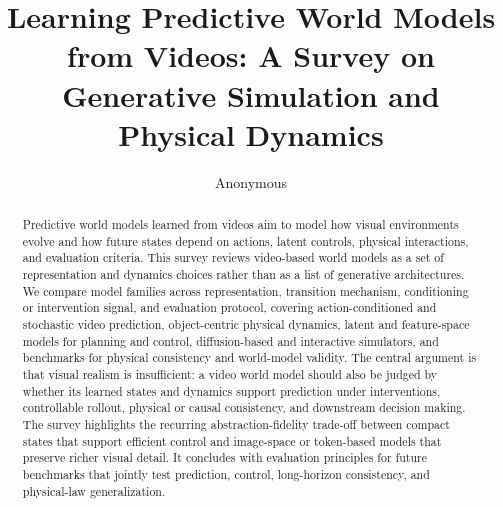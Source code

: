 \documentclass[11pt]{article}
\title{Learning Predictive World Models from Videos: A Survey on Generative Simulation and Physical Dynamics}
\author{Anonymous}
\date{}
\begin{document}
\maketitle

\begin{abstract}
Predictive world models learned from videos aim to model how visual environments evolve and how future states depend on actions, latent controls, physical interactions, and evaluation criteria. This survey reviews video-based world models as a set of representation and dynamics choices rather than as a list of generative architectures. We compare model families across representation, transition mechanism, conditioning or intervention signal, and evaluation protocol, covering action-conditioned and stochastic video prediction, object-centric physical dynamics, latent and feature-space models for planning and control, diffusion-based and interactive simulators, and benchmarks for physical consistency and world-model validity. The central argument is that visual realism is insufficient: a video world model should also be judged by whether its learned states and dynamics support prediction under interventions, controllable rollout, physical or causal consistency, and downstream decision making. The survey highlights the recurring abstraction-fidelity trade-off between compact states that support efficient control and image-space or token-based models that preserve richer visual detail. It concludes with evaluation principles for future benchmarks that jointly test prediction, control, long-horizon consistency, and physical-law generalization.
\end{abstract}













\end{document}
